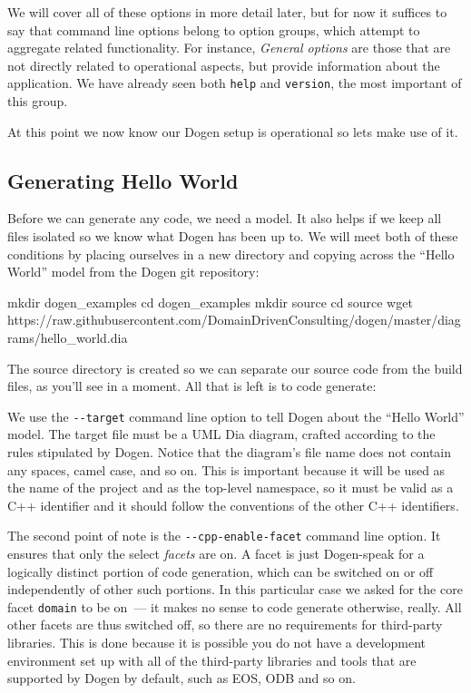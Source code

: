 \documentclass{book}
\begin{document}
We will cover all of these options in more detail later, but for now
it suffices to say that command line options belong to option groups,
which attempt to aggregate related functionality. For instance,
\emph{General options} are those that are not directly related to
operational aspects, but provide information about the application. We
have already seen both \texttt{help} and \texttt{version}, the most
important of this group.

At this point we now know our Dogen setup is operational so lets make
use of it.

\subsection{Generating Hello World}

Before we can generate any code, we need a model. It also helps if we
keep all files isolated so we know what Dogen has been up to. We will
meet both of these conditions by placing ourselves in a new directory
and copying across the ``Hello World'' model from the Dogen git
repository:

\begin{pseudocode}[backgroundcolor=\color{lightgray}]
mkdir dogen_examples
cd dogen_examples
mkdir source
cd source
wget https://raw.githubusercontent.com/DomainDrivenConsulting/dogen/master/diagrams/hello_world.dia
\end{pseudocode}

The source directory is created so we can separate our source code
from the build files, as you'll see in a moment. All that is left is
to code generate:


We use the \texttt{-{}-target} command line option to tell Dogen about
the ``Hello World'' model. The target file must be a UML Dia diagram,
crafted according to the rules stipulated by Dogen. Notice that the
diagram's file name does not contain any spaces, camel case, and so
on. This is important because it will be used as the name of the
project and as the top-level namespace, so it must be valid as a C++
identifier and it should follow the conventions of the other C++
identifiers.

The second point of note is the \texttt{-{}-cpp-enable-facet} command
line option. It ensures that only the select \emph{facets} are on. A
facet is just Dogen-speak for a logically distinct portion of code
generation, which can be switched on or off independently of other
such portions. In this particular case we asked for the core facet
\texttt{domain} to be on~--- it makes no sense to code generate
otherwise, really. All other facets are thus switched off, so there
are no requirements for third-party libraries. This is done because it
is possible you do not have a development environment set up with all
of the third-party libraries and tools that are supported by Dogen by
default, such as EOS, ODB and so on.
\end{document}

